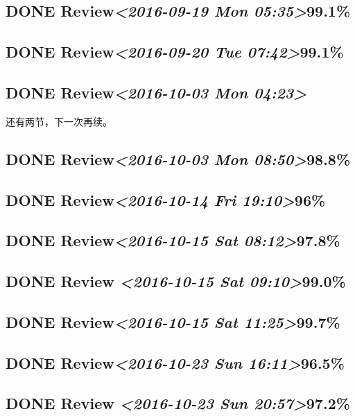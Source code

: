 \documentclass[11pt]{ctexart}
\begin{document}
\subsection{{\bfseries\sffamily DONE} Review\textit{<2016-09-19 Mon 05:35>}99.1\%}
\label{sec:org968ea7c}
\subsection{{\bfseries\sffamily DONE} Review\textit{<2016-09-20 Tue 07:42>}99.1\%}
\label{sec:org1f92d29}
\subsection{{\bfseries\sffamily DONE} Review\textit{<2016-10-03 Mon 04:23>}}
\label{sec:orge6ce796}
还有两节，下一次再续。
\subsection{{\bfseries\sffamily DONE} Review\textit{<2016-10-03 Mon 08:50>}98.8\%}
\label{sec:orgdccb58d}
\subsection{{\bfseries\sffamily DONE} Review\textit{<2016-10-14 Fri 19:10>}96\%}
\label{sec:org89fc50c}
\subsection{{\bfseries\sffamily DONE} Review\textit{<2016-10-15 Sat 08:12>}97.8\%}
\label{sec:org7c214a0}
\subsection{{\bfseries\sffamily DONE} Review \textit{<2016-10-15 Sat 09:10>}99.0\%}
\label{sec:org52bff5a}
\subsection{{\bfseries\sffamily DONE} Review\textit{<2016-10-15 Sat 11:25>}99.7\%}
\label{sec:orgc7ebf36}
\subsection{{\bfseries\sffamily DONE} Review\textit{<2016-10-23 Sun 16:11>}96.5\%}
\label{sec:org6cf6cd3}
\subsection{{\bfseries\sffamily DONE} Review \textit{<2016-10-23 Sun 20:57>}97.2\%}
\label{sec:org59c0819}
\end{document}
